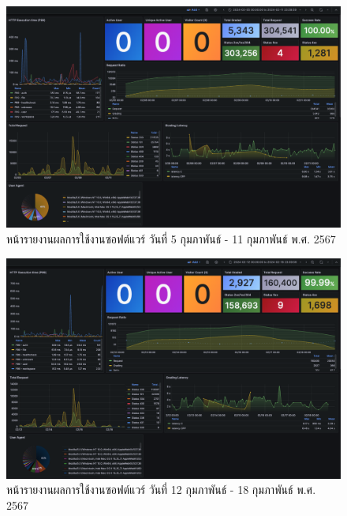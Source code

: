 \documentclass[12pt,one side,openright,a4paper]{cpe-thesis-th}
\begin{document}
\begin{figure}[H]
    \centering
    \includegraphics[width=15cm]{figure/results/grafana/grafana-feb05-feb11.png}
    \caption[หน้ารายงานผลการใช้งานซอฟต์แวร์ วันที่ 5 กุมภาพันธ์ - 11 กุมภาพันธ์ พ.ศ. 2567]{หน้ารายงานผลการใช้งานซอฟต์แวร์ วันที่ 5 กุมภาพันธ์ - 11 กุมภาพันธ์ พ.ศ. 2567}
    \label{fig:res-grafana-f05f11}
\end{figure}

\begin{figure}[H]
    \centering
    \includegraphics[width=15cm]{figure/results/grafana/grafana-feb12-feb18.png}
    \caption[หน้ารายงานผลการใช้งานซอฟต์แวร์ วันที่ 12 กุมภาพันธ์ - 18 กุมภาพันธ์ พ.ศ. 2567]{หน้ารายงานผลการใช้งานซอฟต์แวร์ วันที่ 12 กุมภาพันธ์ - 18 กุมภาพันธ์ พ.ศ. 2567}
    \label{fig:res-grafana-f12f18}
\end{figure}
\end{document}
